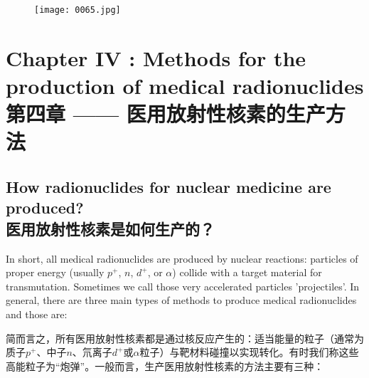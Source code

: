 \documentclass[dvipsnames, svgnames,a4paper,11pt]{article}
\begin{document}
\begin{figure}[ht]
    \centering
    \texttt{[image: 0065.jpg]}
 \label{fig55}
\end{figure}

\newpage

\section{Chapter IV : Methods for the production of medical radionuclides\\第四章 —— 医用放射性核素的生产方法}

\subsection{How radionuclides for nuclear medicine are produced?\\医用放射性核素是如何生产的？}

In short, all medical radionuclides are produced by nuclear reactions: particles of proper energy (usually $p^+$, $n$, $d^+$, or $\alpha$) collide with a target material for transmutation. Sometimes we call those very accelerated particles 'projectiles'. In general, there are three main types of methods to produce medical radionuclides and those are:

简而言之，所有医用放射性核素都是通过核反应产生的：适当能量的粒子（通常为质子$p^+$、中子$n$、氘离子$d^+$或$\alpha$粒子）与靶材料碰撞以实现转化。有时我们称这些高能粒子为“炮弹”。一般而言，生产医用放射性核素的方法主要有三种：
\end{document}
